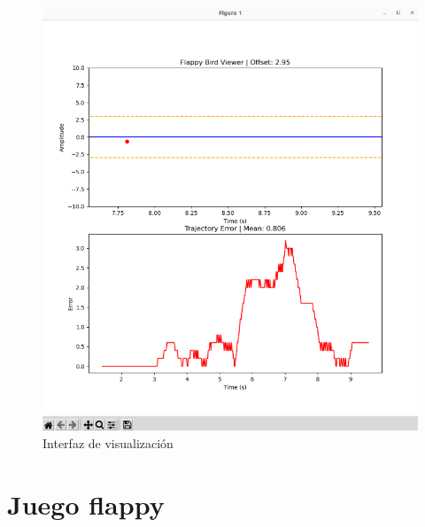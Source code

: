 \begin{figure}[ht!]
	\centering
	\begin{minipage}{0.85\linewidth}
		\centering
		\includegraphics[width=\linewidth]{figs/visual.png}
	\end{minipage}
	\caption[Interfaz de visualización]{Interfaz de visualización}
	\label{fig:visual}
\end{figure}

\section{Juego flappy}
